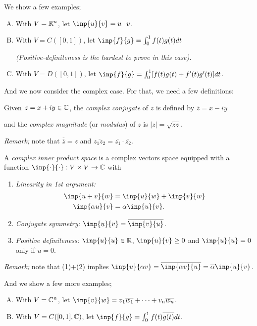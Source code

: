 We show a few examples;
\begin{enumerate}[(A)]
  \item With $V=\mathbb{R}^n$, let $\inp{u}{v}=u\cdot v$.
  \item With $V=C([0,1])$, let $\inp{f}{g} = \int_0^1 f(t)g(t)dt$

  \emph{(Positive-definiteness is the hardest to prove in this case).}

  \item With $V=D([0,1])$, let $\inp{f}{g} = \int_0^1 [f(t)g(t) + f'(t)g'(t)]dt$.
\end{enumerate}


And we now consider the complex case. For that, we need a few definitions:
\begin{definition}
  Given $z=x+iy\in\mathbb{C}$, the \emph{complex conjugate} of $z$ is defined by $\overline{z} = x-iy$

  and the \emph{complex magnitude} (or \emph{modulus}) of $z$ is $|z|=\sqrt{z\overline{z}}$.
\end{definition}

\emph{Remark;} note that $\overline{\overline{z}}=z$ and $\overline{z_1z_2}=\overline{z_1}\cdot\overline{z_2}$.

\begin{definition}
  A \emph{complex inner product space} is a complex vectors space equipped with a function $\inp{\cdot}{\cdot}:V\times V\to\bbC$ with
  \begin{enumerate}[(1)]
    \item\emph{Linearity in 1st argument:}
    \begin{align*}
      \inp{u+v}{w} &= \inp{u}{w} + \inp{v}{w}\\
      \inp{\alpha u}{v} &= \alpha\inp{u}{v}.
    \end{align*}
    \item\emph{Conjugate symmetry:} $\inp{u}{v} = \overline{\inp{v}{u}}$.
    \item\emph{Positive definiteness:} $\inp{u}{u}\in\bbR$, $\inp{u}{v}\geq 0$ and $\inp{u}{u}=0$ only if $u=0$.
  \end{enumerate}
\end{definition}

\emph{Remark;} note that (1)+(2) implies $\inp{u}{\alpha v} = \overline{\inp{\alpha v}{u}}=\overline{\alpha}\inp{u}{v}$.

And we show a few more examples;
\begin{enumerate}[(A)]
  \item With $V=\mathbb{C}^n$, let $\inp{v}{w}=v_1\overline{w_1} + \cdots + v_n\overline{w_n}$.
  \item With $V=C([0,1],\mathbb{C})$, let $\inp{f}{g}=\int_0^1 f(t)\overline{g(t)}dt$.
\end{enumerate}


